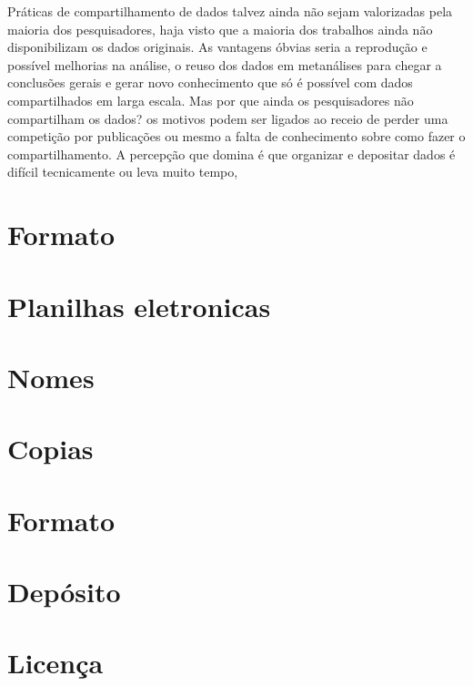 \documentclass[]{book}
\begin{document}
Práticas de compartilhamento de dados talvez ainda não sejam valorizadas
pela maioria dos pesquisadores, haja visto que a maioria dos trabalhos
ainda não disponibilizam os dados originais. As vantagens óbvias seria a
reprodução e possível melhorias na análise, o reuso dos dados em
metanálises para chegar a conclusões gerais e gerar novo conhecimento
que só é possível com dados compartilhados em larga escala. Mas por que
ainda os pesquisadores não compartilham os dados? os motivos podem ser
ligados ao receio de perder uma competição por publicações ou mesmo a
falta de conhecimento sobre como fazer o compartilhamento. A percepção
que domina é que organizar e depositar dados é difícil tecnicamente ou
leva muito tempo,

\hypertarget{formato}{%
\section{Formato}\label{formato}}

\hypertarget{planilhas-eletronicas}{%
\section{Planilhas eletronicas}\label{planilhas-eletronicas}}

\hypertarget{nomes}{%
\section{Nomes}\label{nomes}}

\hypertarget{copias}{%
\section{Copias}\label{copias}}

\hypertarget{formato-1}{%
\section{Formato}\label{formato-1}}

\hypertarget{deposito}{%
\section{Depósito}\label{deposito}}

\hypertarget{licenca}{%
\section{Licença}\label{licenca}}


\end{document}
